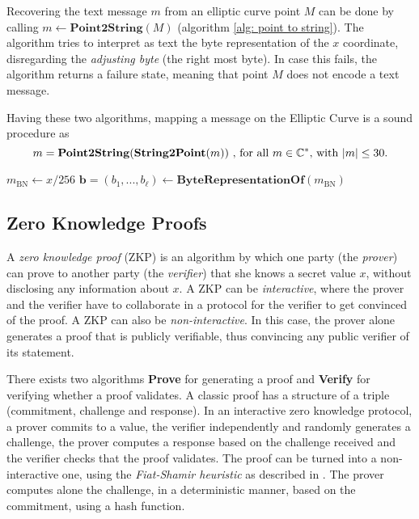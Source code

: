 Recovering the text message $m$ from an elliptic curve point $M$ can be done
by calling \( m \gets \mathbf{Point2String}(M) \) (algorithm \ref{alg: point to string}). The algorithm tries to interpret as text the byte representation of the $x$ coordinate, disregarding the \textit{adjusting byte} (the right most byte). In case this fails, the algorithm returns a failure state, meaning that point $M$ does not encode a text message.

\newpage
Having these two algorithms, mapping a message on the Elliptic Curve is a sound procedure as
\[ m = \mathbf{Point2String}(\mathbf{String2Point}(m)) \text{ , for all \( m \in \mathbb{C}^* \), with \( |m| \leq 30 \).} \]

\begin{algorithm}[!h]
\DontPrintSemicolon
    \caption{\( \mathbf{Point2String} (M) \)}
    \( m_\mathrm{BN} \gets x / 256 \) 
    \( \boldsymbol{b} = (b_1, ..., b_\ell) \gets \mathbf{ByteRepresentationOf} (m_\mathrm{BN}) \) \;

    

     
\end{algorithm}

\subsection{Zero Knowledge Proofs}
A \textit{zero knowledge proof} (ZKP) is an algorithm by which one party (the \textit{prover}) can prove to another party (the \textit{verifier}) that she knows a secret value $x$, without disclosing any information about $x$. A ZKP can be \textit{interactive}, where the prover and the verifier have to collaborate in a protocol for the verifier to get convinced of the proof. A ZKP can also be \textit{non-interactive}. In this case, the prover alone generates a proof that is publicly verifiable, thus convincing any public verifier of its statement. 

There exists two algorithms \textbf{Prove} for generating a proof and \textbf{Verify} for verifying whether a proof validates. A classic proof has a structure of a triple (commitment, challenge and response). In an interactive zero knowledge protocol, a prover commits to a value, the verifier independently and randomly generates a challenge, the prover computes a response based on the challenge received and the verifier checks that the proof validates. The proof can be turned into a non-interactive one, using the \textit{Fiat-Shamir heuristic} as described in \cite{Fiat87}. The prover computes alone the challenge, in a deterministic manner, based on the commitment, using a hash function.

